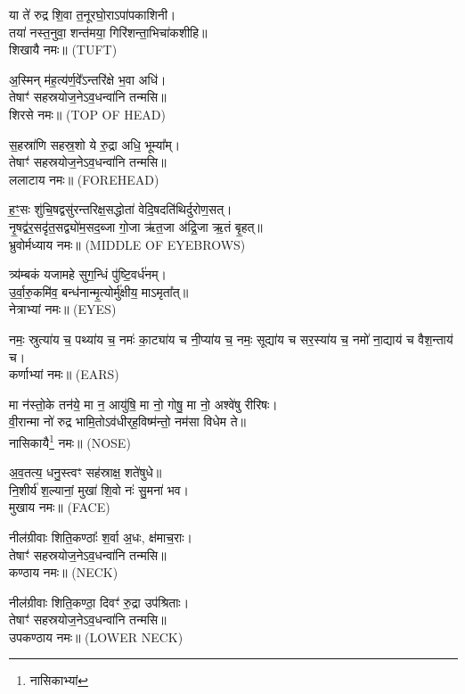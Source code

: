 

 या ते॑ रुद्र शि॒वा त॒नूरघो॒राऽपा॑पकाशिनी।\\
 तया॑ नस्त॒नुवा॒ शन्त॑मया॒ गिरि॑शन्ता॒भिचा॑कशीहि॥\\ शिखायै नमः॥ {\scriptsize (TUFT)}

अ॒स्मिन् म॑ह॒त्य॑र्ण॒वे᳚ऽन्तरि॑क्षे भ॒वा अधि॑।\\
 तेषाꣳ॑ सहस्रयोज॒नेऽव॒धन्वा॑नि तन्मसि॥ \\
शिरसे नमः॥ {\scriptsize (TOP OF HEAD)}

स॒हस्रा॑णि सहस्र॒शो ये रु॒द्रा अधि॒ भूम्या᳚म्।\\
 तेषाꣳ॑ सहस्रयोज॒नेऽव॒धन्वा॑नि तन्मसि॥\\
ललाटाय नमः॥ {\scriptsize (FOREHEAD)}

ह॒ꣳ॒सः शु॑चि॒षद्वसु॑रन्तरिक्ष॒सद्धोता॑ वेदि॒षदति॑थिर्दुरोण॒सत्।\\
नृ॒षद्व॑र॒सदृ॑त॒सद्व्यो॑म॒सद॒ब्जा गो॒जा ऋ॑त॒जा अ॑द्रि॒जा ऋ॒तं बृ॒हत्॥\\
भ्रुवोर्मध्याय नमः॥ {\scriptsize (MIDDLE OF EYEBROWS)}


त्र्य॑म्बकं यजामहे सुग॒न्धिं पु॑ष्टि॒वर्ध॑नम्।\\
 उ॒र्वा॒रु॒कमि॑व॒ बन्ध॑नान्मृ॒त्योर्मु॑क्षीय॒ माऽमृता᳚त्॥\\
नेत्राभ्यां नमः॥ {\scriptsize (EYES)}

नमः॒ स्रुत्या॑य च॒ पथ्या॑य च॒ नमः॑ का॒ट्या॑य च नी॒प्या॑य च॒ %
 नमः॒ सूद्या॑य च सर॒स्या॑य च॒ नमो॑ ना॒द्याय॑ च वैश॒न्ताय॑ च।\\
कर्णाभ्यां नमः॥ {\scriptsize (EARS)}

मा न॑स्तो॒के तन॑ये॒ मा न॒ आयु॑षि॒ मा नो॒ गोषु॒ मा नो॒ अश्वे॑षु रीरिषः।\\
 वी॒रान्मा नो॑ रुद्र भामि॒तोऽव॑धीर्‌ह॒विष्म॑न्तो॒ नम॑सा विधेम ते॥ \\
नासिकायै\footnote{नासिकाभ्यां} नमः॥ {\scriptsize (NOSE)}

अ॒व॒तत्य॒ धनु॒स्त्वꣳ सह॑स्राक्ष॒ शते॑षुधे॥\\
 नि॒शीर्य॑ श॒ल्यानां॒ मुखा॑ शि॒वो नः॑ सु॒मना॑ भव।\\
मुखाय नमः॥ {\scriptsize (FACE)}

 नील॑ग्रीवाः शिति॒कण्ठाः᳚ श॒र्वा अ॒धः, क्ष॑माच॒राः।\\
 तेषाꣳ॑ सहस्रयोज॒नेऽव॒धन्वा॑नि तन्मसि॥\\
कण्ठाय नमः॥ {\scriptsize (NECK)}

नील॑ग्रीवाः शिति॒कण्ठा॒ दिवꣳ॑ रु॒द्रा उप॑श्रिताः।\\
 तेषाꣳ॑ सहस्रयोज॒नेऽव॒धन्वा॑नि तन्मसि॥\\
उपकण्ठाय नमः॥ {\scriptsize (LOWER NECK)}

